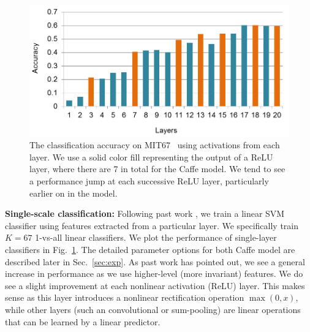 \documentclass[10pt,twocolumn,letterpaper]{article}
\begin{document}
\begin{figure}[t!]
\centering
	\includegraphics[width=\columnwidth]{fig/fig_layer_caffe.png}

\caption{The classification accuracy on MIT67~\cite{MIT67} using activations from each layer. We use a solid color fill representing the output of a ReLU layer, where there are 7 in total for the Caffe model. We tend to see a performance jump at each successive ReLU layer, particularly earlier on in the model.}
\label{fig:layer_MIT67}
\end{figure}

{\bf Single-scale classification:} Following past work \cite{cnn_baseline}, we train a linear SVM classifier using features extracted from a particular layer. We specifically train $K=67$ 1-vs-all linear classifiers.
We plot the performance of single-layer classifiers in Fig.~\ref{fig:layer_MIT67}. The detailed parameter options for both Caffe model are described later in Sec.~\ref{sec:exp}. As past work has pointed out, we see a general increase in performance as we use higher-level (more invariant) features. We do see a slight improvement at each nonlinear activation (ReLU) layer. This makes sense as this layer introduces a nonlinear rectification operation $\max(0,x)$, while other layers (such an convolutional or sum-pooling) are linear operations that can be learned by a linear predictor.
\end{document}
